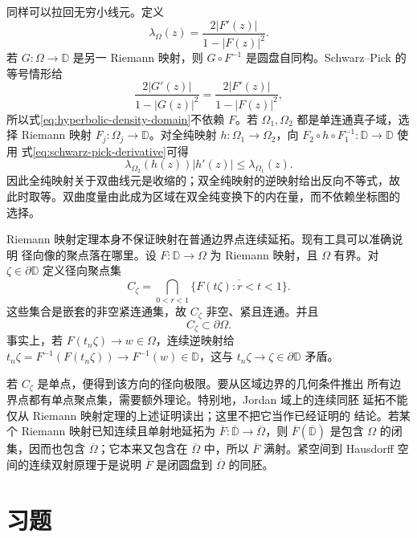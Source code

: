 同样可以拉回无穷小线元。定义
\begin{equation}\label{eq:hyperbolic-density-domain}
 \lambda_\Omega(z)=\frac{2|F'(z)|}{1-|F(z)|^2}.
\end{equation}
若 $G:\Omega\to\mathbb D$ 是另一 Riemann 映射，则
$G\circ F^{-1}$ 是圆盘自同构。Schwarz--Pick 的等号情形给
\[
 \frac{2|G'(z)|}{1-|G(z)|^2}
 =\frac{2|F'(z)|}{1-|F(z)|^2},
\]
所以式\eqref{eq:hyperbolic-density-domain}不依赖 $F$。若 $\Omega_1,\Omega_2$
都是单连通真子域，选择 Riemann 映射
$F_j:\Omega_j\to\mathbb D$。对全纯映射 $h:\Omega_1\to\Omega_2$，向
$F_2\circ h\circ F_1^{-1}:\mathbb D\to\mathbb D$ 使用
式\eqref{eq:schwarz-pick-derivative}可得
\begin{equation}\label{eq:hyperbolic-density-contraction}
 \lambda_{\Omega_2}(h(z))|h'(z)|\le \lambda_{\Omega_1}(z).
\end{equation}
因此全纯映射关于双曲线元是收缩的；双全纯映射的逆映射给出反向不等式，故
此时取等。双曲度量由此成为区域在双全纯变换下的内在量，而不依赖坐标图的
选择。

Riemann 映射定理本身不保证映射在普通边界点连续延拓。现有工具可以准确说明
径向像的聚点落在哪里。设 $F:\mathbb D\to\Omega$ 为 Riemann 映射，且
$\Omega$ 有界。对 $\zeta\in\partial\mathbb D$ 定义径向聚点集
\[
 C_\zeta=\bigcap_{0<r<1}
 \overline{\{F(t\zeta):r<t<1\}}.
\]
这些集合是嵌套的非空紧连通集，故 $C_\zeta$ 非空、紧且连通。并且
\begin{equation}\label{eq:riemann-radial-cluster-boundary}
 C_\zeta\subset\partial\Omega.
\end{equation}
事实上，若 $F(t_n\zeta)\to w\in\Omega$，连续逆映射给
$t_n\zeta=F^{-1}(F(t_n\zeta))\to F^{-1}(w)\in\mathbb D$，这与
$t_n\zeta\to\zeta\in\partial\mathbb D$ 矛盾。

若 $C_\zeta$ 是单点，便得到该方向的径向极限。要从区域边界的几何条件推出
所有边界点都有单点聚点集，需要额外理论。特别地，Jordan 域上的连续同胚
延拓不能仅从 Riemann 映射定理的上述证明读出；这里不把它当作已经证明的
结论。若某个 Riemann 映射已知连续且单射地延拓为
$\overline F:\overline{\mathbb D}\to\overline\Omega$，则
$\overline F(\overline{\mathbb D})$ 是包含 $\Omega$ 的闭集，因而也包含
$\overline\Omega$；它本来又包含在 $\overline\Omega$ 中，所以
$\overline F$ 满射。紧空间到 Hausdorff 空间的连续双射原理于是说明
$\overline F$ 是闭圆盘到 $\overline\Omega$ 的同胚。

\section*{习题}

